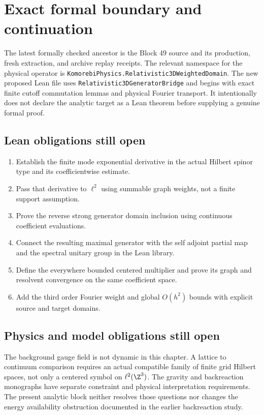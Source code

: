\section{Exact formal boundary and continuation}
The latest formally checked ancestor is the Block 49 source and its production, fresh extraction, and archive replay receipts. The relevant namespace for the physical operator is \texttt{KomorebiPhysics.Relativistic3DWeightedDomain}. The new proposed Lean file uses \texttt{Relativistic3DGeneratorBridge} and begins with exact finite cutoff commutation lemmas and physical Fourier transport. It intentionally does not declare the analytic target as a Lean theorem before supplying a genuine formal proof.

\subsection{Lean obligations still open}
\begin{enumerate}[leftmargin=1.5em,itemsep=.15em]
\item Establish the finite mode exponential derivative in the actual Hilbert spinor type and its coefficientwise estimate.
\item Pass that derivative to $\ell^2$ using summable graph weights, not a finite support assumption.
\item Prove the reverse strong generator domain inclusion using continuous coefficient evaluations.
\item Connect the resulting maximal generator with the self adjoint partial map and the spectral unitary group in the Lean library.
\item Define the everywhere bounded centered multiplier and prove its graph and resolvent convergence on the same coefficient space.
\item Add the third order Fourier weight and global $O(h^2)$ bounds with explicit source and target domains.
\end{enumerate}

\subsection{Physics and model obligations still open}
The background gauge field is not dynamic in this chapter. A lattice to continuum comparison requires an actual compatible family of finite grid Hilbert spaces, not only a centered symbol on $\ell^2(\Z^3)$. The gravity and backreaction monographs have separate constraint and physical interpretation requirements. The present analytic block neither resolves those questions nor changes the energy availability obstruction documented in the earlier backreaction study.

